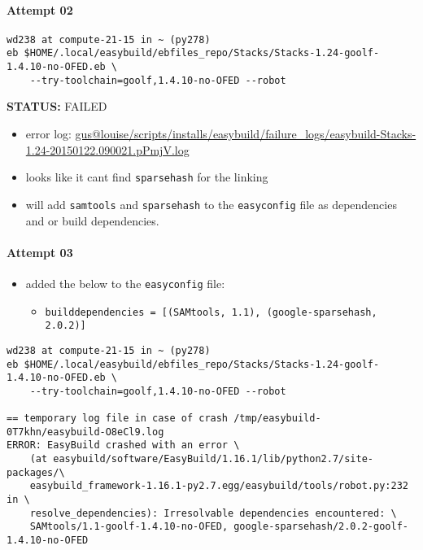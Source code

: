 \documentclass[letterpaper]{scrartcl}
\begin{document}
\paragraph{Attempt 02}\label{attempt-02}

\begin{verbatim}
wd238 at compute-21-15 in ~ (py278)
eb $HOME/.local/easybuild/ebfiles_repo/Stacks/Stacks-1.24-goolf-1.4.10-no-OFED.eb \
    --try-toolchain=goolf,1.4.10-no-OFED --robot
\end{verbatim}

\textbf{STATUS:} FAILED

\begin{itemize}
\itemsep1pt\parskip0pt
\item
  error log:
  \href{file:///home/gus/remote_mounts/louise/scripts/installs/easybuild/failure_logs/easybuild-Stacks-1.24-20150122.090021.pPmjV.log}{gus@louise/scripts/installs/easybuild/failure\_logs/easybuild-Stacks-1.24-20150122.090021.pPmjV.log}
\item
  looks like it cant find \texttt{sparsehash} for the linking
\item
  will add \texttt{samtools} and \texttt{sparsehash} to the
  \texttt{easyconfig} file as dependencies and or build dependencies.
\end{itemize}

\paragraph{Attempt 03}\label{attempt-03}

\begin{itemize}
\itemsep1pt\parskip0pt
\item
  added the below to the \texttt{easyconfig} file:

  \begin{itemize}
  \itemsep1pt\parskip0pt
  \item
    \texttt{builddependencies = {[}(\textquotesingle{}SAMtools\textquotesingle{}, \textquotesingle{}1.1\textquotesingle{}), (\textquotesingle{}google-sparsehash\textquotesingle{}, \textquotesingle{}2.0.2\textquotesingle{}){]}}
  \end{itemize}
\end{itemize}

\begin{verbatim}
wd238 at compute-21-15 in ~ (py278)
eb $HOME/.local/easybuild/ebfiles_repo/Stacks/Stacks-1.24-goolf-1.4.10-no-OFED.eb \
    --try-toolchain=goolf,1.4.10-no-OFED --robot

== temporary log file in case of crash /tmp/easybuild-0T7khn/easybuild-O8eCl9.log
ERROR: EasyBuild crashed with an error \
    (at easybuild/software/EasyBuild/1.16.1/lib/python2.7/site-packages/\
    easybuild_framework-1.16.1-py2.7.egg/easybuild/tools/robot.py:232 in \
    resolve_dependencies): Irresolvable dependencies encountered: \
    SAMtools/1.1-goolf-1.4.10-no-OFED, google-sparsehash/2.0.2-goolf-1.4.10-no-OFED
\end{verbatim}
\end{document}
